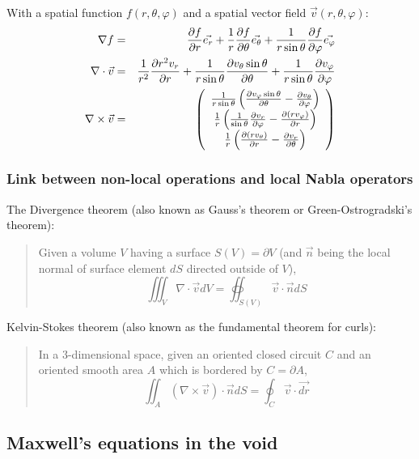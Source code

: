 \documentclass[a4paper,10pt]{article}
\newcommand{\pderiv}[2]{\ensuremath\frac{\partial #2}{\partial #1}}
\newcommand{\pdr}[1]{\ensuremath\pderiv{r}{#1}}
\newcommand{\pdth}[1]{\ensuremath\pderiv{\theta}{#1}}
\newcommand{\pdph}[1]{\ensuremath\pderiv{\varphi}{#1}}
\begin{document}
With a spatial function $f(r, \theta, \varphi)$ and a spatial vector field $\vec{v}(r, \theta, \varphi)$:
\begin{eqnarray}
  \nabla f &=& \pdr{f}\vec{e_r} + \frac{1}{r}\pdth{f}\vec{e_\theta} + \frac{1}{r \sin\theta}\pdph{f}\vec{e_\varphi} \\
  \nabla \cdot \vec{v} &=& \frac{1}{r^2}\pdr{r^2 v_r} + \frac{1}{r \sin\theta}\pdth{v_\theta \sin\theta} + \frac{1}{r\sin\theta}\pdph{v_\varphi} \\
  \nabla \times \vec{v} &=& \left(\begin{array}{c}
    \frac{1}{r \sin\theta}\left(\pdth{v_\varphi \sin\theta} - \pdph{v_\theta}\right) \\
    \frac{1}{r}\left(\frac{1}{\sin\theta}\pdph{v_r} - \pdr{(r v_\varphi)}\right) \\
    \frac{1}{r}\left(\pdr{(r v_\theta)} - \pdth{v_r}\right)
    \end{array}\right)
\end{eqnarray}

\subsubsection{Link between non-local operations and local Nabla operators}

The Divergence theorem (also known as Gauss's theorem or Green-Ostrogradski's theorem):
\begin{quote}
  Given a volume $V$ having a surface $S(V) = \partial V$ (and $\vec{n}$ being the local normal of surface element $dS$ directed outside of $V$),
  \begin{equation}
    \iiint_V \nabla \cdot \vec{v} dV = \oiint_{S(V)} \vec{v} \cdot \vec{n}dS
  \end{equation}
\end{quote}

Kelvin-Stokes theorem (also known as the fundamental theorem for curls):
\begin{quote}
  In a 3-dimensional space, given an oriented closed circuit $C$ and an oriented smooth area $A$ which is bordered by $C = \partial A$,
  \begin{equation}
    \iint_A (\nabla \times \vec{v}) \cdot \vec{n}dS = \oint_C \vec{v} \cdot \vec{dr}
  \end{equation}
\end{quote}

\subsection{Maxwell's equations in the void}
\end{document}
